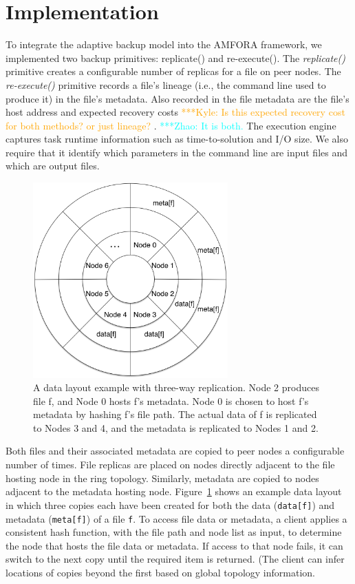 \documentclass{sig-alternate}
\newcommand{\zhaonote}[1]{{\textcolor{cyan}    { ***Zhao:      #1 }}}
\newcommand{\kylenote}[1]{{\textcolor{orange}    { ***Kyle:      #1 }}}
\newcommand{\zhaonote}[1]{}
\newcommand{\kylenote}[1]{}
\begin{document}
\section{Implementation}
\label{sec:Impl}
To integrate the adaptive backup model into the AMFORA framework, we implemented two backup primitives: replicate() and re-execute(). The {\em replicate()} primitive creates a configurable number of replicas for a file on peer nodes. The {\em re-execute()} primitive records a file's lineage (i.e., the command line used to produce it) in the file's metadata. Also recorded in the file metadata are the file's host address and expected recovery costs
\kylenote{Is this expected recovery cost for both methods? or just lineage?}. 
\zhaonote{It is both.}
The execution engine captures task runtime information such as time-to-solution and I/O size. We also require that it
identify which parameters in the command line are input files and which are output files.

\begin{figure}[ht]
	\begin{center}
		\includegraphics[width=75mm]{pictures/datalayout}
		\caption{A data layout example with three-way replication. Node 2 produces file f, and Node 0 hosts f's
		metadata. Node 0 is chosen to host f's metadata by hashing f's file path. The actual data of f is replicated to Nodes 3 and 4, and the metadata is replicated
		to Nodes 1 and 2.
		\label{fig:datalayout}}
  	\end{center}
\end{figure}

Both files and their associated metadata are copied to peer nodes a configurable number of times.
File replicas are placed on nodes directly adjacent to the file hosting node in the ring topology.
Similarly, metadata are copied to nodes adjacent to the metadata hosting node.
Figure~\ref{fig:datalayout} shows an example data layout in which three copies each have been
created for both the data ({\tt data[f]}) and metadata ({\tt meta[f]}) of a file {\tt f}.
To access file data or metadata, a client applies a consistent hash function, with the file path and node list as input, to determine the node that hosts the file data or metadata. If access to that node fails, it can switch to the next copy until the required item is returned. (The client can infer locations of copies beyond the first based on global topology information.
\end{document}

